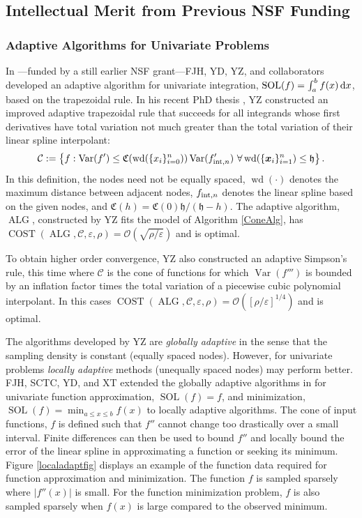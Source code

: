 \documentclass[11pt]{NSFamsart}
\DeclareMathOperator{\cost}{COST}
\DeclareMathOperator{\size}{wd}
\newcommand{\hcut}{\mathfrak{h}}
\newcommand{\design}{\{\bx_i\}_{i=1}^n}
\DeclareMathOperator{\Var}{Var}
\DeclareMathOperator{\SOL}{SOL}
\DeclareMathOperator{\ALG}{ALG}
\newcommand{\bx}{{\boldsymbol{x}}}
\def\dif{\textup{d}}
\newcommand{\cc}{\mathcal{C}}
\newcommand{\fC}{\mathfrak{C}}
\newcommand{\Order}{\mathcal{O}}
\newcommand{\inflate}{\fC}
\begin{document}



\subsection{Intellectual Merit from Previous NSF Funding}
\label{previousmeritsubsec}

\subsubsection{Adaptive Algorithms for Univariate Problems} \label{localadpatsec}
In \cite{HicEtal14b}---funded by a still earlier NSF grant---FJH, YD, YZ, and collaborators developed an adaptive algorithm for univariate integration, $\SOL(f) = \int_a^b f(x) \, \dif x$, based on the trapezoidal rule.  In his recent PhD thesis \cite{Zha18a}, YZ constructed an improved adaptive trapezoidal rule that succeeds for all integrands whose first derivatives have total variation not much greater than the total variation of their linear spline interpolant:
\[
\cc: = \left \{ f : \Var(f') \le \inflate(\size(\{x_i\}_{i=0}^n)) \Var(f'_{\textup{int},n}) \ \forall \size(\design) \le \hcut \right\}.
\]
In this definition, the nodes need not be equally spaced, $\size(\cdot)$ denotes the maximum distance between adjacent nodes, $f_{\textup{int},n}$ denotes the linear spline based on the given nodes, and $\inflate(h) = \inflate(0) \hcut/(\hcut - h)$.  The adaptive algorithm, $\ALG$, constructed by YZ fits the model of Algorithm \ref{ConeAlg}, has  $\cost(\ALG,\cc,\varepsilon, \rho) =  \Order(\sqrt{\rho/\varepsilon})$ and is optimal.  

To obtain higher order convergence, YZ also constructed an adaptive Simpson's rule, this time where $\cc$ is the cone of functions for which $\Var(f''')$ is bounded by an inflation factor times the total variation of a piecewise cubic polynomial interpolant.  In this cases  $\cost(\ALG,\cc,\varepsilon, \rho) =  \Order([\rho/\varepsilon]^{1/4})$ and is optimal.  

The algorithms developed by YZ are \emph{globally adaptive} in the sense that the sampling density is constant (equally spaced nodes).  However, for univariate problems \emph{locally adaptive} methods (unequally spaced nodes) may perform better.  FJH, SCTC, YD, and XT extended the globally adaptive algorithms in \cite{HicEtal14b} for univariate function approximation, $\SOL(f) = f$, and minimization, $\SOL(f) = \min_{a \le x \le b} f(x)$ to locally adaptive algorithms.  The cone of input functions, $f$ is defined such that $f''$ cannot change too drastically over a small interval.  Finite differences can then be used to bound $f''$ and locally bound the error of the linear spline in approximating a function or seeking its minimum. Figure 
\ref{localadaptfig} displays an example of the function data required for function approximation and minimization.  The function $f$ is 
sampled sparsely where $|f''(x)|$ is small. For the function minimization problem, $f$ is also sampled sparsely when $f(x)$ is large compared to the observed minimum.
\end{document}
